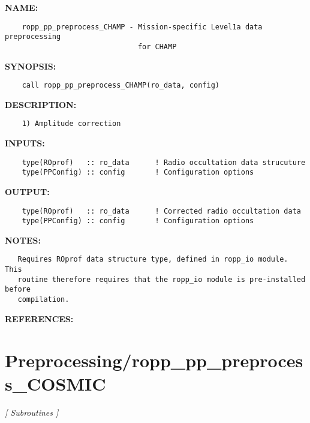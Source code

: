 \label{ch:robo80}
\label{ch:Preprocessing_ropp_pp_preprocess_CHAMP}
\textbf{NAME:}\hspace{0.08in}\begin{Verbatim}
    ropp_pp_preprocess_CHAMP - Mission-specific Level1a data preprocessing
                               for CHAMP
\end{Verbatim}
\textbf{SYNOPSIS:}\hspace{0.08in}\begin{Verbatim}
    call ropp_pp_preprocess_CHAMP(ro_data, config)
\end{Verbatim}
\textbf{DESCRIPTION:}\hspace{0.08in}\begin{Verbatim}
    1) Amplitude correction
\end{Verbatim}
\textbf{INPUTS:}\hspace{0.08in}\begin{Verbatim}
    type(ROprof)   :: ro_data      ! Radio occultation data strucuture
    type(PPConfig) :: config       ! Configuration options
\end{Verbatim}
\textbf{OUTPUT:}\hspace{0.08in}\begin{Verbatim}
    type(ROprof)   :: ro_data      ! Corrected radio occultation data
    type(PPConfig) :: config       ! Configuration options
\end{Verbatim}
\textbf{NOTES:}\hspace{0.08in}\begin{Verbatim}
   Requires ROprof data structure type, defined in ropp_io module. This 
   routine therefore requires that the ropp_io module is pre-installed before
   compilation.
\end{Verbatim}
\textbf{REFERENCES:}\hspace{0.08in}\section{Preprocessing/ropp\_pp\_preprocess\_COSMIC}
\textsl{[ Subroutines ]}


